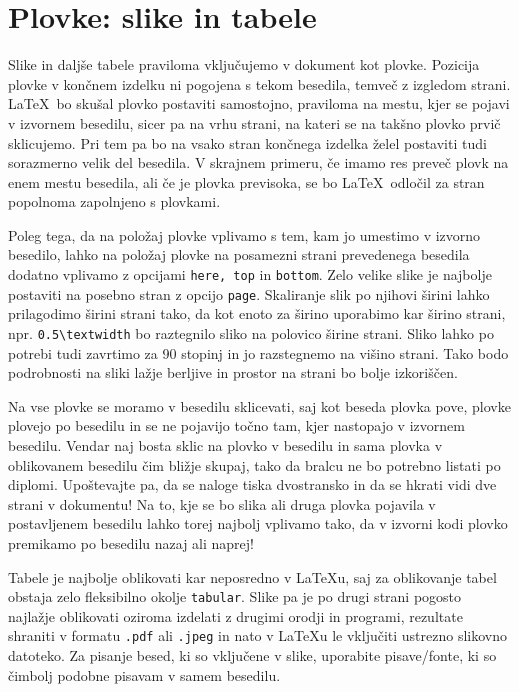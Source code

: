 \chapter{Plovke: slike in tabele}
\label{ch2}

Slike in daljše tabele praviloma vključujemo v dokument kot plovke.
Pozicija plovke v končnem izdelku ni pogojena s tekom besedila, temveč z izgledom strani.
\LaTeX\ bo skušal plovko postaviti samostojno, praviloma na mestu, kjer se pojavi v izvornem
besedilu, sicer pa na vrhu strani, na kateri se na takšno plovko prvič sklicujemo.
Pri tem pa bo na vsako stran končnega izdelka želel postaviti tudi sorazmerno velik del besedila.
V skrajnem primeru, če imamo res preveč plovk na enem mestu besedila, ali če je plovka previsoka,
se bo \LaTeX\ odločil za stran popolnoma zapolnjeno s plovkami.

Poleg tega, da na položaj plovke vplivamo s tem, kam jo umestimo v izvorno besedilo, lahko na
položaj plovke na posamezni strani prevedenega besedila dodatno vplivamo z opcijami
\texttt{here, top} in \texttt{bottom}.
Zelo velike slike je najbolje postaviti na posebno stran z opcijo \texttt{page}.
Skaliranje slik po njihovi širini lahko prilagodimo širini strani tako, da kot enoto za širino
uporabimo kar širino strani, npr. \verb=0.5\textwidth= bo raztegnilo sliko na polovico širine strani.
Sliko lahko po potrebi tudi zavrtimo za 90 stopinj in jo razstegnemo na višino strani.
Tako bodo podrobnosti na sliki lažje berljive in prostor na strani bo bolje izkoriščen.

Na vse plovke se moramo v besedilu sklicevati, saj kot beseda plovka pove, plovke plovejo po
besedilu in se ne pojavijo točno tam, kjer nastopajo v izvornem besedilu.
Vendar naj bosta  sklic na plovko v besedilu in sama plovka v oblikovanem besedilu čim bližje
skupaj, tako da bralcu ne bo potrebno listati po diplomi.
Upoštevajte pa, da se naloge tiska dvostransko in da se hkrati vidi dve strani v dokumentu!
Na to, kje se bo slika ali druga plovka pojavila v postavljenem besedilu lahko torej najbolj
vplivamo tako, da v izvorni kodi plovko premikamo po besedilu nazaj ali naprej!

Tabele je najbolje oblikovati kar neposredno v \LaTeX u, saj za oblikovanje tabel obstaja zelo
fleksibilno okolje \texttt{tabular}.
Slike pa je po drugi strani  pogosto najla\v zje oblikovati oziroma izdelati z drugimi orodji
in programi, rezultate shraniti v formatu {\tt .pdf} ali {\tt .jpeg} in nato v \LaTeX u le
vključiti ustrezno slikovno datoteko. Za pisanje besed, ki so vključene v slike, uporabite
pisave/fonte, ki so čimbolj podobne pisavam v samem besedilu.

